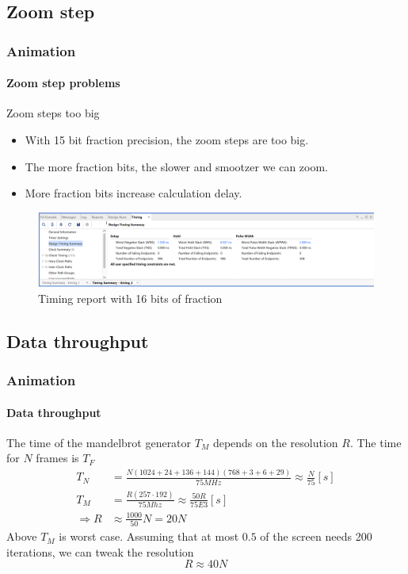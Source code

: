 \documentclass{beamer}
\begin{document}
\subsection{Zoom step}
\begin{frame}
    \frametitle{Animation}
    \framesubtitle{Zoom step problems}
    \begin{alertblock}{Zoom steps too big}
        \begin{itemize}
            \item With 15 bit fraction precision, the zoom steps are too big.
            \item The more fraction bits, the slower and smootzer we can zoom.
            \item More fraction bits increase calculation delay.
        \end{itemize}
        \begin{figure}
            \caption{Timing report with 16 bits of fraction}
            \includegraphics[width=\textwidth]{../imgs/timing_report.PNG}
        \end{figure}
    \end{alertblock}
\end{frame}

\subsection{Data throughput}
\begin{frame}
    \frametitle{Animation}
    \framesubtitle{Data throughput}
    The time of the mandelbrot generator $T_M$ depends on the resolution $R$. The time for $N$ frames is $T_F$
    \begin{equation}
        \begin{split}
            T_N&= \frac{N(1024 + 24 + 136 + 144)(768 + 3 + 6 + 29)}{75MHz}\approx\frac{N}{75}[s]\\
            T_M &=   \frac{R(257\cdot192)}{75Mhz}\approx\frac{50R}{75E3}[s]\\
            \Rightarrow R &\approx \frac{1000}{50}N = 20N
        \end{split}
    \end{equation}
    Above $T_M$ is worst case. Assuming that at most $0.5$ of the screen needs 200 iterations, we can tweak the resolution
    \begin{equation}
        R \approx 40N
    \end{equation}
\end{frame}
\end{document}
